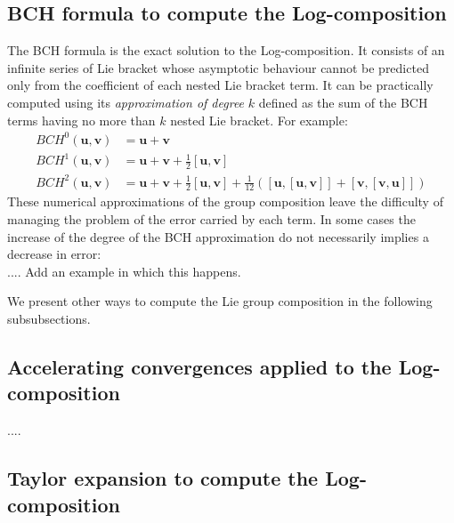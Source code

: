\subsection{BCH formula to compute the Log-composition}

The BCH formula is the exact solution to the Log-composition. 
It consists of an infinite series of Lie bracket whose asymptotic behaviour cannot be predicted only from the coefficient of each nested Lie bracket term. It can be practically computed using its \emph{approximation of degree} $k$ defined as the sum of the BCH terms having no more than $k$ nested Lie bracket. For example:
\begin{align*}
BCH^{0}(\mathbf{u},\mathbf{v}) &= \mathbf{u} + \mathbf{v} \\
BCH^{1}(\mathbf{u},\mathbf{v}) &=  \mathbf{u} + \mathbf{v} + \frac{1}{2}[\mathbf{u},\mathbf{v}] \\
BCH^{2}(\mathbf{u},\mathbf{v}) &=  \mathbf{u} + \mathbf{v} + \frac{1}{2}[\mathbf{u},\mathbf{v}] + \frac{1}{12}([\mathbf{u},[\mathbf{u},\mathbf{v}]] + [\mathbf{v},[\mathbf{v},\mathbf{u}]])
\end{align*}
These numerical approximations of the group composition leave the difficulty of managing the problem of the error carried by each term. In some cases the increase of the degree of the BCH approximation do not necessarily implies a decrease in error: \\
.... Add an example in which this happens.

We present other ways to compute the Lie group composition in the following subsubsections.

\subsection{Accelerating convergences applied to the Log-composition}

....

\subsection{Taylor expansion to compute the Log-composition}

